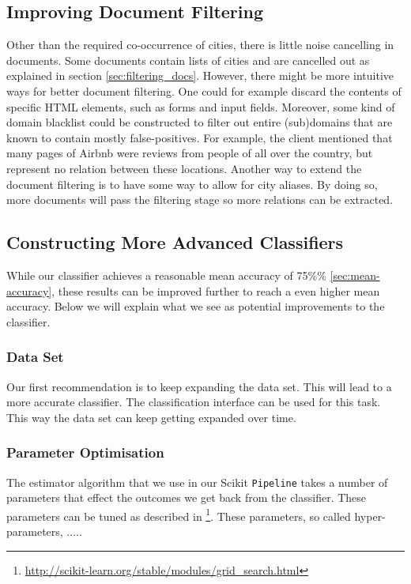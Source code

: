 \subsection{Improving Document Filtering}
Other than the required co-occurrence of cities, there is little noise cancelling in documents. Some documents contain lists of cities and are cancelled out as explained in section \ref{sec:filtering_docs}. However, there might be more intuitive ways for better document filtering. One could for example discard the contents of specific HTML elements, such as forms and input fields. Moreover, some kind of domain blacklist could be constructed to filter out entire (sub)domains that are known to contain mostly false-positives. For example, the client mentioned that many pages of Airbnb were reviews from people of all over the country, but represent no relation between these locations. Another way to extend the document filtering is to have some way to allow for city aliases. By doing so, more documents will pass the filtering stage so more relations can be extracted.

\subsection{Constructing More Advanced Classifiers}
While our classifier achieves a reasonable mean accuracy of 75\%\% \ref{sec:mean-accuracy}, these results can be improved further to reach a even higher mean accuracy. Below we will explain what we see as potential improvements to the classifier.

\subsubsection{Data Set}
Our first recommendation is to keep expanding the data set. This will lead to a more accurate classifier. The classification interface can be used for this task. This way the data set can keep getting expanded over time.
\subsubsection{Parameter Optimisation}
The estimator algorithm that we use in our Scikit \texttt{Pipeline} takes a number of parameters that effect the outcomes we get back from the classifier. These parameters can be tuned as described in \footnote{\url{http://scikit-learn.org/stable/modules/grid_search.html}}. These parameters, so called hyper-parameters, .....
